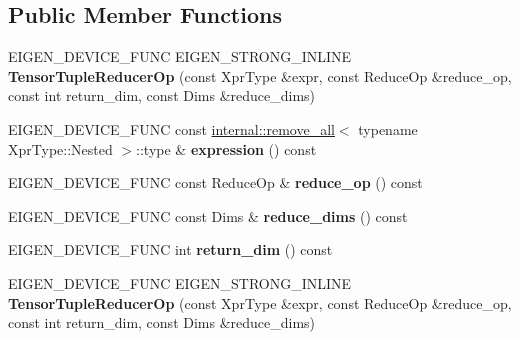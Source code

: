 \subsection*{Public Member Functions}
\begin{DoxyCompactItemize}
\item 
\mbox{\label{class_eigen_1_1_tensor_tuple_reducer_op_ad3ec6f979fc4645fce33e76d3c7a76c9}} 
E\+I\+G\+E\+N\+\_\+\+D\+E\+V\+I\+C\+E\+\_\+\+F\+U\+NC E\+I\+G\+E\+N\+\_\+\+S\+T\+R\+O\+N\+G\+\_\+\+I\+N\+L\+I\+NE {\bfseries Tensor\+Tuple\+Reducer\+Op} (const Xpr\+Type \&expr, const Reduce\+Op \&reduce\+\_\+op, const int return\+\_\+dim, const Dims \&reduce\+\_\+dims)
\item 
\mbox{\label{class_eigen_1_1_tensor_tuple_reducer_op_ae98721e8a105621a4e7c0bb2c7f05fb8}} 
E\+I\+G\+E\+N\+\_\+\+D\+E\+V\+I\+C\+E\+\_\+\+F\+U\+NC const \hyperlink{struct_eigen_1_1internal_1_1remove__all}{internal\+::remove\+\_\+all}$<$ typename Xpr\+Type\+::\+Nested $>$\+::type \& {\bfseries expression} () const
\item 
\mbox{\label{class_eigen_1_1_tensor_tuple_reducer_op_ac66cab80f82eaf021eeb73f71a63e916}} 
E\+I\+G\+E\+N\+\_\+\+D\+E\+V\+I\+C\+E\+\_\+\+F\+U\+NC const Reduce\+Op \& {\bfseries reduce\+\_\+op} () const
\item 
\mbox{\label{class_eigen_1_1_tensor_tuple_reducer_op_a2f0828e47d33fd105e0e1e6a7e6e7f04}} 
E\+I\+G\+E\+N\+\_\+\+D\+E\+V\+I\+C\+E\+\_\+\+F\+U\+NC const Dims \& {\bfseries reduce\+\_\+dims} () const
\item 
\mbox{\label{class_eigen_1_1_tensor_tuple_reducer_op_acaea785a115dcb17be0d2b857170cfff}} 
E\+I\+G\+E\+N\+\_\+\+D\+E\+V\+I\+C\+E\+\_\+\+F\+U\+NC int {\bfseries return\+\_\+dim} () const
\item 
\mbox{\label{class_eigen_1_1_tensor_tuple_reducer_op_ad3ec6f979fc4645fce33e76d3c7a76c9}} 
E\+I\+G\+E\+N\+\_\+\+D\+E\+V\+I\+C\+E\+\_\+\+F\+U\+NC E\+I\+G\+E\+N\+\_\+\+S\+T\+R\+O\+N\+G\+\_\+\+I\+N\+L\+I\+NE {\bfseries Tensor\+Tuple\+Reducer\+Op} (const Xpr\+Type \&expr, const Reduce\+Op \&reduce\+\_\+op, const int return\+\_\+dim, const Dims \&reduce\+\_\+dims)

\end{DoxyCompactItemize}
